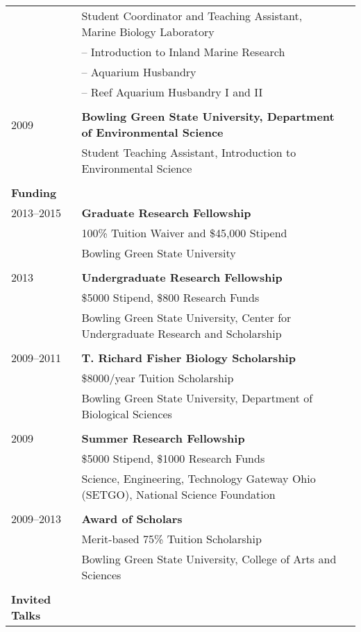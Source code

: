 \documentclass[letterpaper,7pt,oneside]{article}
\begin{document}
\begin{small}
\begin{longtable}{@{} l p{5.3in}l}
 & Student Coordinator and Teaching Assistant, Marine Biology Laboratory \\
 & – Introduction to Inland Marine Research \\
 & – Aquarium Husbandry \\
 & – Reef Aquarium Husbandry I and II \\
 & \\
 \large{2009}
 & \textbf{Bowling Green State University, Department of Environmental Science} \\
 & Student Teaching Assistant, Introduction to Environmental Science \\
 & \\
 
 \Large{\textbf{Funding}}  \vspace{5mm} \\
 \large{2013–2015}
     & \textbf{Graduate Research Fellowship} \\
     & 100\% Tuition Waiver and \$45,000 Stipend \\
     & Bowling Green State University \\
     & \\
 \large{2013}
& \textbf{Undergraduate Research Fellowship} \\
& \$5000 Stipend, \$800 Research Funds \\
& Bowling Green State University, Center for Undergraduate Research and Scholarship \\
& \\
 \large{2009–2011}
& \textbf{T. Richard Fisher Biology Scholarship} \\
& \$8000/year Tuition Scholarship \\
& Bowling Green State University, Department of Biological Sciences \\
& \\
 \large{2009}
& \textbf{Summer Research Fellowship} \\
& \$5000 Stipend, \$1000 Research Funds \\
& Science, Engineering, Technology Gateway Ohio (SETGO), National Science Foundation \\
& \\
 \large{2009–2013}
& \textbf{Award of Scholars} \\
& Merit-based 75\% Tuition Scholarship \\
& Bowling Green State University, College of Arts and Sciences \\
& \\
 \Large{\textbf{Invited Talks}}  \vspace{5mm} \\

\end{longtable}
\end{small}
\end{document}
